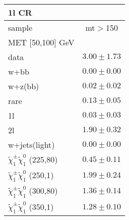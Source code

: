 \begin{table}
\begin{center}
\small
\begin{tabular}{lc}
\hline
1l CR & \\
\hline
sample&mt$>$150\\
\hline
MET [50,100] GeV &  \\
\hline
data&$3.00\pm1.73$\\
\hline
w+bb&$0.00\pm0.00$\\
w+z(bb)&$0.02\pm0.02$\\
rare&$0.13\pm0.05$\\
1l&$0.03\pm0.03$\\
2l&$1.90\pm0.32$\\
w+jets(light)&$0.00\pm0.00$\\
$\tilde{\chi}_{1}^{\pm}\tilde{\chi}_{1}^{0}$ (225,80)&$0.45\pm0.11$\\
$\tilde{\chi}_{1}^{\pm}\tilde{\chi}_{1}^{0}$ (250,1)&$1.99\pm0.24$\\
$\tilde{\chi}_{1}^{\pm}\tilde{\chi}_{1}^{0}$ (300,80)&$1.36\pm0.14$\\
$\tilde{\chi}_{1}^{\pm}\tilde{\chi}_{1}^{0}$ (350,1)&$1.28\pm0.10$\\
\hline
\hline\hline
\hline
\end{tabular}
\end{center}
\end{table}
